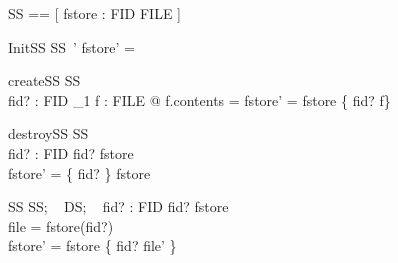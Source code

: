 \begin{zed}
  [FID]
\end{zed}

\begin{zed}
  SS == [ fstore : FID \pfun FILE ]
\end{zed}

\begin{schema}{InitSS}
  SS~'
\where
  fstore' = \emptyset
\end{schema}

\begin{schema}{createSS}
  \Delta SS \\
  fid? : FID
\where
  \exists_{1} f : FILE @ f.contents = \emptyset \land fstore' = fstore \oplus \{ fid? \mapsto  f\}
\end{schema}

\begin{schema}{destroySS}
  \Delta SS \\
  fid? : FID
\where
  fid? \in \dom fstore \\
  fstore' = \{ fid? \} \ndres fstore
\end{schema}

\begin{schema}{\Phi SS}
  \Delta SS;   ~ 
  \Delta DS;  ~ 
  fid? : FID
\where
  fid? \in \dom fstore \\
  file = fstore(fid?) \\
  fstore' = fstore \oplus \{ fid? \mapsto file' \}
\end{schema}

